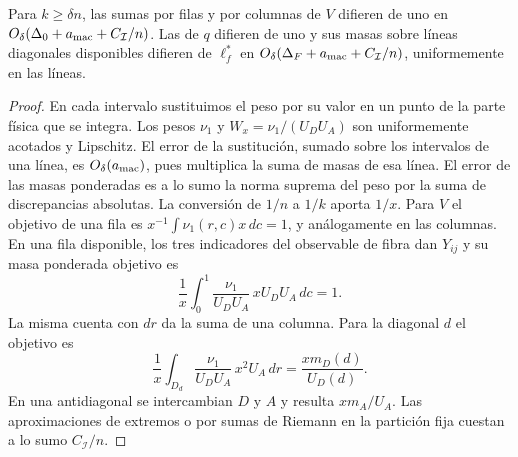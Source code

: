 \begin{lema}\label{macro:balances}
Para $k\ge\delta n$, las sumas por filas y por columnas de $V$ difieren de uno en
$O_\delta(\Delta_0+a_{\rm mac}+C_{\mathcal I}/n)$. Las de $q$ difieren de uno y sus masas sobre líneas
diagonales
disponibles difieren de $\ell_f^*$ en
$O_\delta(\Delta_F+a_{\rm mac}+C_{\mathcal I}/n)$, uniformemente en las líneas.
\end{lema}
\begin{proof}
En cada intervalo sustituimos el peso por su valor en un punto de la parte física que se integra. Los
pesos $\nu_1$ y $W_x=\nu_1/(U_DU_A)$ son uniformemente acotados y Lipschitz. El error de la sustitución,
sumado sobre los intervalos de una línea, es $O_\delta(a_{\rm mac})$, pues multiplica la suma de masas
de esa
línea. El error de las masas ponderadas es a lo sumo la norma suprema del peso por la suma de
discrepancias absolutas. La conversión de $1/n$ a $1/k$ aporta $1/x$. Para $V$ el objetivo de una fila
es $x^{-1}\int\nu_1(r,c)x\,dc=1$, y análogamente en las columnas. En una fila disponible, los tres
indicadores del observable de fibra dan $Y_{ij}$ y su masa ponderada objetivo es
\[
 \frac1x\int_0^1 \frac{\nu_1}{U_DU_A}\,xU_DU_A\,dc=1.
\]
La misma cuenta con $dr$ da la suma de una columna. Para la diagonal $d$ el objetivo es
\[
 \frac1x\int_{D_d}\frac{\nu_1}{U_DU_A}\,x^2U_A\,dr
 =\frac{xm_D(d)}{U_D(d)} .
\]
En una antidiagonal se intercambian $D$ y $A$ y resulta $xm_A/U_A$. Las aproximaciones de extremos o
por sumas de Riemann en la partición fija cuestan a lo sumo $C_{\mathcal I}/n$.
\end{proof}
